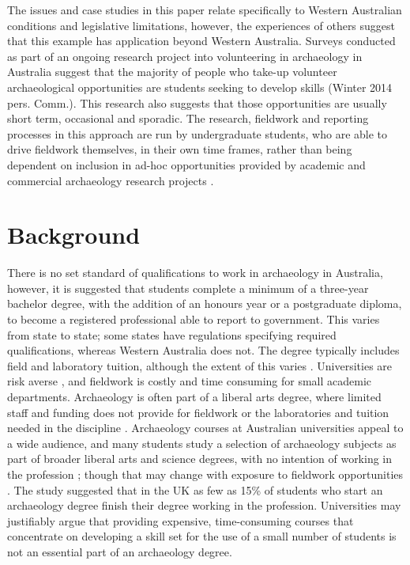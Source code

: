 \documentclass{ijsra}
\begin{document}
The issues and case studies in this paper relate specifically to Western Australian conditions and legislative limitations, however, the experiences of others \parencites[e.g.][]{boytner2012}{mytum2012a}{mytum2012b}{scarlett2012} suggest that this example has application beyond Western Australia.
Surveys conducted as part of an ongoing research project into volunteering in archaeology in Australia suggest that the majority of people who take-up volunteer archaeological opportunities are students seeking to develop skills (Winter 2014 pers. Comm.).%
This research also suggests that those opportunities are usually short term, occasional and sporadic. 
The research, fieldwork and reporting processes in this approach are run by undergraduate students, who are able to drive fieldwork themselves, in their own time frames, rather than being dependent on inclusion in ad-hoc opportunities provided by academic and commercial archaeology research projects \parencites[see][90]{boytner2012}[222]{clark2012}[70-72]{colley2012}. 

\section{Background}

There is no set standard of qualifications to work in archaeology in Australia, however, it is suggested that students complete a minimum of a three-year bachelor degree, with the addition of an honours year or a postgraduate diploma, to become a registered professional able to report to government. 
This varies from state to state; some states have regulations specifying required qualifications, whereas Western Australia does not. 
The degree typically includes field and laboratory tuition, although the extent of this varies \parencite{gibbs2005}. 
Universities are risk averse \parencite[6]{boytner2012}, and fieldwork is costly and time consuming for small academic departments. 
Archaeology is often part of a liberal arts degree, where limited staff and funding does not provide for fieldwork or the laboratories and tuition needed in the discipline \parencites{colley2004}{colley2012}{gibbs2005}{cosgrove2013}. 
Archaeology courses at Australian universities appeal to a wide audience, and many students study a selection of archaeology subjects as part of broader liberal arts and science degrees, with no intention of working in the profession \parencites[28]{gibbs2005}[44]{cosgrove2013}; 
though that may change with exposure to fieldwork opportunities \parencite[29]{cobb2012}. 
The \textcite[31]{cobb2012} study suggested that in the UK as few as 15\% of students who start an archaeology degree finish their degree working in the profession. 
Universities may justifiably argue that providing expensive, time-consuming courses that concentrate on developing a skill set for the use of a small number of students is not an essential part of an archaeology degree.
\end{document}
